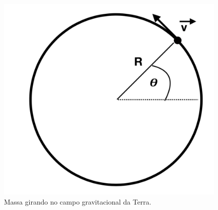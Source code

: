 \documentclass[]{IMTexam}
\begin{document}
\bigskip

\begin{figure}[H]
	\centering
	\includegraphics[width=0.4\linewidth]{screenshot008}
	\caption{Massa girando no campo gravitacional da Terra.}
	\label{fig:fig5}
\end{figure}
\end{document}
